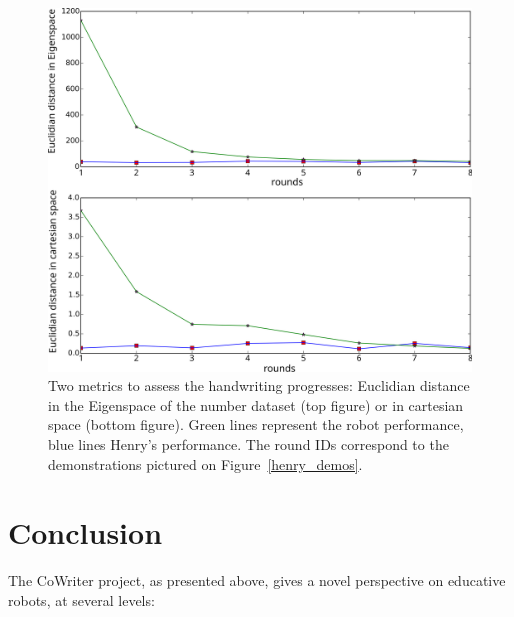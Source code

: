 \documentclass{article}
\begin{document}
\begin{figure}
    \centering
    \includegraphics[width=0.9\linewidth]{learning_6_distances}
    \caption{\small Two metrics to assess the handwriting progresses: Euclidian
    distance in the Eigenspace of the number dataset (top figure) or in
cartesian space (bottom figure). Green lines represent the robot performance,
blue lines Henry's performance. The round IDs correspond to the demonstrations
pictured on Figure~\ref{henry_demos}.}
    \label{henry_distances}
\end{figure}

\section{Conclusion}

The CoWriter project, as presented above, gives a novel perspective on educative
robots, at several levels:
\end{document}
